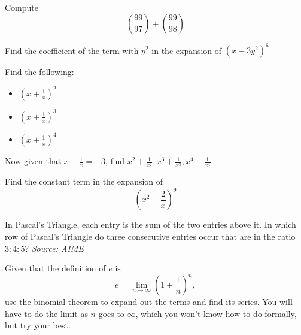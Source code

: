 \begin{problem}
Compute $$\binom{99}{97}+\binom{99}{98}$$
\end{problem}

\begin{problem}
Find the coefficient of the term with $y^2$ in the expansion of $(x-3y^2)^6$
\end{problem}

\begin{problem}
Find the following:

\begin{itemize}
    \item $\left(x+\frac{1}{x}\right)^2$
    \item $\left(x+\frac{1}{x}\right)^3$
    \item $\left(x+\frac{1}{x}\right)^4$
\end{itemize}

Now given that $x+\frac{1}{x}=-3$, find $x^2+\frac{1}{x^2}, x^3+\frac{1}{x^3}, x^4+\frac{1}{x^4}$.
\end{problem}

\begin{problem}
Find the constant term in the expansion of 
$$\left(x^2-\frac{2}{x}\right)^9$$
\end{problem}

\begin{problem}
In Pascal's Triangle, each entry is the sum of the two entries above it. In which row of Pascal's Triangle do three consecutive entries occur that are in the ratio $3: 4: 5$? \textit{Source: AIME}
\end{problem}

\begin{problem}
Given that the definition of $e$ is 
$$e = \lim_{n\to\infty} \left(1 + \frac{1}{n}\right)^n,$$
use the binomial theorem to expand out the terms and find its series. You will have to do the limit as $n$ goes to $\infty$, which you won't know how to do formally, but try your best.
\end{problem}